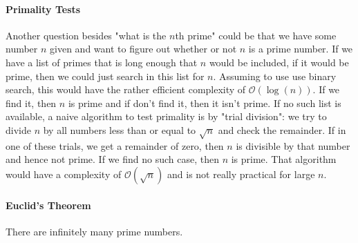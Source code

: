 \paragraph{Primality Tests}
Another question besides "what is the $n$th prime" could be that we have some number $n$ given and want to figure out whether or not $n$ is a prime number. If we have a list of primes that is long enough that $n$ would be included, if it would be prime, then we could just search in this list for $n$. Assuming to use use binary search, this would have the rather efficient complexity of $\mathcal{O}(\log(n))$. If we find it, then $n$ is prime and if don't find it, then it isn't prime. If no such list is available, a naive algorithm to test primality is by "trial division": we try to divide $n$ by all numbers less than or equal to $\sqrt{n}$ and check the remainder. If in one of these trials, we get a remainder of zero, then $n$ is divisible by that number and hence not prime. If we find no such case, then $n$ is prime. That algorithm would have a complexity of $\mathcal{O}(\sqrt{n})$ and is not really practical for large $n$.






\paragraph{Euclid's Theorem} There are infinitely many prime numbers.




